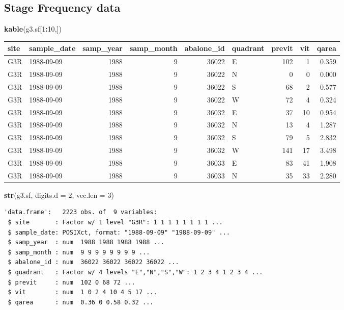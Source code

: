 \documentclass[]{article}
\newenvironment{Shaded}{\begin{snugshade}}{\end{snugshade}}
\newcommand{\DataTypeTok}[1]{\textcolor[rgb]{0.13,0.29,0.53}{#1}}
\newcommand{\DecValTok}[1]{\textcolor[rgb]{0.00,0.00,0.81}{#1}}
\newcommand{\KeywordTok}[1]{\textcolor[rgb]{0.13,0.29,0.53}{\textbf{#1}}}
\newcommand{\NormalTok}[1]{#1}
\newcommand{\OperatorTok}[1]{\textcolor[rgb]{0.81,0.36,0.00}{\textbf{#1}}}
\begin{document}
\hypertarget{stage-frequency-data}{%
\subsection{Stage Frequency data}\label{stage-frequency-data}}

\begin{Shaded}
\begin{Highlighting}[]
\KeywordTok{kable}\NormalTok{(g3.sf[}\DecValTok{1}\OperatorTok{:}\DecValTok{10}\NormalTok{,])}
\end{Highlighting}
\end{Shaded}

\begin{tabular}{l|l|r|r|r|l|r|r|r}
\hline
site & sample\_date & samp\_year & samp\_month & abalone\_id & quadrant & previt & vit & qarea\\
\hline
G3R & 1988-09-09 & 1988 & 9 & 36022 & E & 102 & 1 & 0.359\\
\hline
G3R & 1988-09-09 & 1988 & 9 & 36022 & N & 0 & 0 & 0.000\\
\hline
G3R & 1988-09-09 & 1988 & 9 & 36022 & S & 68 & 2 & 0.577\\
\hline
G3R & 1988-09-09 & 1988 & 9 & 36022 & W & 72 & 4 & 0.324\\
\hline
G3R & 1988-09-09 & 1988 & 9 & 36032 & E & 37 & 10 & 0.954\\
\hline
G3R & 1988-09-09 & 1988 & 9 & 36032 & N & 13 & 4 & 1.287\\
\hline
G3R & 1988-09-09 & 1988 & 9 & 36032 & S & 79 & 5 & 2.832\\
\hline
G3R & 1988-09-09 & 1988 & 9 & 36032 & W & 141 & 17 & 3.498\\
\hline
G3R & 1988-09-09 & 1988 & 9 & 36033 & E & 83 & 41 & 1.908\\
\hline
G3R & 1988-09-09 & 1988 & 9 & 36033 & N & 35 & 33 & 2.280\\
\hline
\end{tabular}

\begin{Shaded}
\begin{Highlighting}[]
\KeywordTok{str}\NormalTok{(g3.sf, }\DataTypeTok{digits.d =} \DecValTok{2}\NormalTok{, }\DataTypeTok{vec.len =} \DecValTok{3}\NormalTok{) }
\end{Highlighting}
\end{Shaded}

\begin{verbatim}
'data.frame':   2223 obs. of  9 variables:
 $ site       : Factor w/ 1 level "G3R": 1 1 1 1 1 1 1 1 ...
 $ sample_date: POSIXct, format: "1988-09-09" "1988-09-09" ...
 $ samp_year  : num  1988 1988 1988 1988 ...
 $ samp_month : num  9 9 9 9 9 9 9 9 ...
 $ abalone_id : num  36022 36022 36022 36022 ...
 $ quadrant   : Factor w/ 4 levels "E","N","S","W": 1 2 3 4 1 2 3 4 ...
 $ previt     : num  102 0 68 72 ...
 $ vit        : num  1 0 2 4 10 4 5 17 ...
 $ qarea      : num  0.36 0 0.58 0.32 ...
\end{verbatim}
\end{document}
